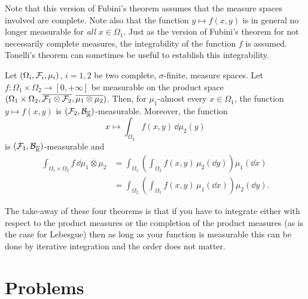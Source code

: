 Note that this version of Fubini's theorem assumes that the measure spaces involved are complete. 
Note also that the function $y \mapsto f(x,y)$ is in general no longer measurable for \emph{all} $x \in \Omega_1$. Just as the version of Fubini's theorem for not necessarily complete measures, the integrability of the function $f$ is assumed. Tonelli's theorem can sometimes be useful to establish this integrability.

\begin{theorem}
	Let $(\Omega_i, \mathcal F_i, \mu_i)$, $i=1,2$ be two complete, $\sigma$-finite, measure spaces. 
	Let $f : \Omega_1 \times \Omega_2 \to [0,+\infty]$ be measurable on the product space $(\Omega_1 \times \Omega_2, \overline{\mathcal F_1 \otimes \mathcal F_2}, \overline{\mu_1 \otimes \mu_2})$. Then, for $\mu_1$-almost every $x \in \Omega_1$, the function $y \mapsto f(x, y)$ is $(\mathcal F_2,\mathcal B_{\overline{\mathbb R}})$-measurable. Moreover, the function 
	\[
	x \mapsto \int_{\Omega_2} f(x,y)\, \dd \mu_2(y)
	\]
	is $(\mathcal F_1,\mathcal B_{\overline{\mathbb R}})$-measurable and
	\[
	\begin{split}
	\int_{\Omega_1 \times \Omega_2} f \,\dd \overline{\mu_1 \otimes \mu_2} 
	&= \int_{\Omega_1} \left( \int_{\Omega_2 } f(x,  y ) \,\mu_2(\dd y) \right) \mu_1(\dd x)\\
	&= \int_{\Omega_2} \left( \int_{\Omega_1} f(x, y)  \,\mu_1(\dd x) \right) \mu_2(\dd y).
	\end{split}
	\] 	
\end{theorem}

The take-away of these four theorems is that if you have to integrate either with respect to the product measures or the completion of the product measures (as is the case for Lebesgue) then as long as your function is measurable this can be done by iterative integration and the order does not matter.


\section{Problems}

